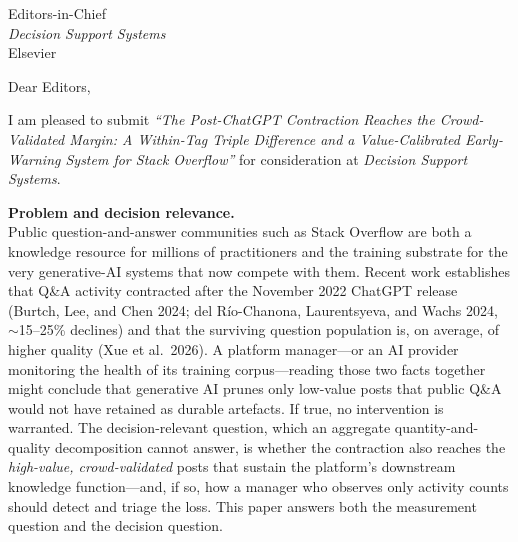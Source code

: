 \documentclass[12pt]{letter}
\begin{document}
\begin{letter}{Editors-in-Chief \\ \emph{Decision Support Systems} \\ Elsevier}

\opening{Dear Editors,}

I am pleased to submit \emph{``The Post-ChatGPT Contraction
Reaches the Crowd-Validated Margin: A Within-Tag Triple
Difference and a Value-Calibrated Early-Warning System for
Stack Overflow''} for consideration at \emph{Decision Support
Systems}.

\noindent\textbf{Problem and decision relevance.}\\
Public question-and-answer communities such as Stack Overflow
are both a knowledge resource for millions of practitioners
and the training substrate for the very generative-AI systems
that now compete with them. Recent work establishes that
Q\&A activity contracted after the November 2022 ChatGPT
release (Burtch, Lee, and Chen 2024; del R\'io-Chanona,
Laurentsyeva, and Wachs 2024, $\sim$15--25\% declines) and
that the surviving question population is, on average, of
higher quality (Xue et al.\ 2026). A platform manager---or an
AI provider monitoring the health of its training
corpus---reading those two facts together might conclude that
generative AI prunes only low-value posts that public Q\&A
would not have retained as durable artefacts. If true, no
intervention is warranted. The decision-relevant question,
which an aggregate quantity-and-quality decomposition cannot
answer, is whether the contraction also reaches the
\emph{high-value, crowd-validated} posts that sustain the
platform's downstream knowledge function---and, if so, how a
manager who observes only activity counts should detect and
triage the loss. This paper answers both the measurement
question and the decision question.


\end{letter}
\end{document}
